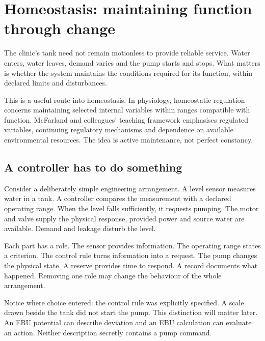 \chapter{Homeostasis: maintaining function through change}\label{ch:homeostasis}

The clinic's tank need not remain motionless to provide reliable service. Water enters, water leaves, demand varies and the pump starts and stops. What matters is whether the system maintains the conditions required for its function, within declared limits and disturbances.

This is a useful route into homeostasis. In physiology, homeostatic regulation concerns maintaining selected internal variables within ranges compatible with function. McFarland and colleagues' teaching framework emphasises regulated variables, continuing regulatory mechanisms and dependence on available environmental resources.\cite{homeostasis} The idea is active maintenance, not perfect constancy.

\section{A controller has to do something}
Consider a deliberately simple engineering arrangement. A level sensor measures water in a tank. A controller compares the measurement with a declared operating range. When the level falls sufficiently, it requests pumping. The motor and valve supply the physical response, provided power and source water are available. Demand and leakage disturb the level.

Each part has a role. The sensor provides information. The operating range states a criterion. The control rule turns information into a request. The pump changes the physical state. A reserve provides time to respond. A record documents what happened. Removing one role may change the behaviour of the whole arrangement.

Notice where choice entered: the control rule was explicitly specified. A scale drawn beside the tank did not start the pump. This distinction will matter later. An EBU potential can describe deviation and an EBU calculation can evaluate an action. Neither description secretly contains a pump command.



